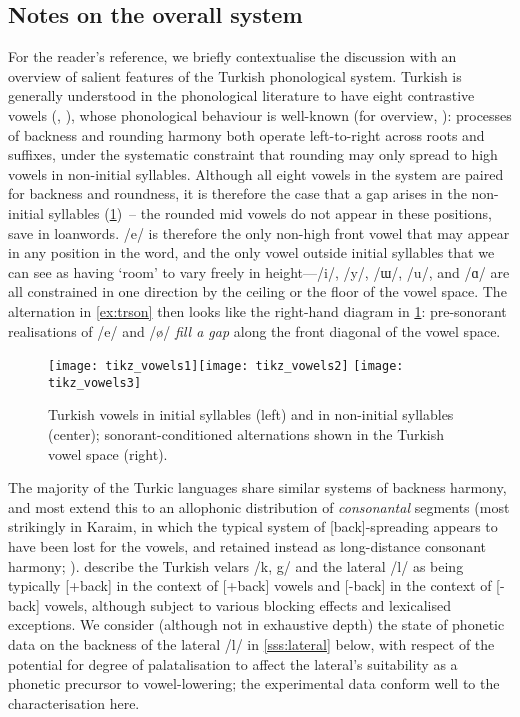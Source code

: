 \subsection{Notes on the overall system}\label{sss:trphonology}
For the reader's reference, we briefly contextualise the discussion with an overview of salient features of the Turkish phonological system. Turkish is generally understood in the phonological literature to have eight contrastive vowels (\citealt{Hulst1991}, \citealt{Kabak2011}), whose phonological behaviour is well-known (for overview, \citealt{Clements1982,Kabak2011}): processes of backness and rounding harmony both operate left-to-right across roots and suffixes, under the systematic constraint that rounding may only spread to high vowels in non-initial syllables. Although all eight vowels in the system are paired for backness and roundness, it is therefore the case that a gap arises in the non-initial syllables (\cref{fig:trvowelsall}) – the rounded mid vowels do not appear in these positions, save in loanwords. /e/ is therefore the only non-high front vowel that may appear in any position in the word, and the only vowel outside initial syllables that we can see as having `room' to vary freely in height---/i/, /y/, /ɯ/, /u/, and /ɑ/ are all constrained in one direction by the ceiling or the floor of the vowel space. The alternation in \cref{ex:trson} then looks like the right-hand diagram in  \cref{fig:trvowelsall}: pre-sonorant realisations of /e/ and /ø/ \emph{fill a gap} along the front diagonal of the vowel space. \\

\begin{figure}[ht]
  \centering
 \texttt{[image: tikz\_vowels1]}\hfill  \texttt{[image: tikz\_vowels2]} \hfill  \texttt{[image: tikz\_vowels3]}
\caption{Turkish vowels in initial syllables (left) and in non-initial syllables (center); sonorant-conditioned alternations shown in the Turkish vowel space (right).}
\label{fig:trvowelsall}
\end{figure}

The majority of the Turkic languages share similar systems of backness harmony, and most extend this to an allophonic distribution of \emph{consonantal} segments (most strikingly in Karaim, in which the typical system of [back]-spreading appears to have been lost for the vowels, and retained instead as long-distance consonant harmony; \citealt{Nevins2003}). \cite{Clements1982} describe the Turkish velars /k, g/ and the lateral /l/ as being typically [+back] in the context of [+back] vowels and [-back] in the context of [-back] vowels, although subject to various blocking effects and lexicalised exceptions. We consider (although not in exhaustive depth) the state of phonetic data on the backness of the lateral /l/ in \cref{sss:lateral} below, with respect of the potential for degree of palatalisation to affect the lateral's suitability as a phonetic precursor to vowel-lowering; the experimental data conform well to the characterisation here.

